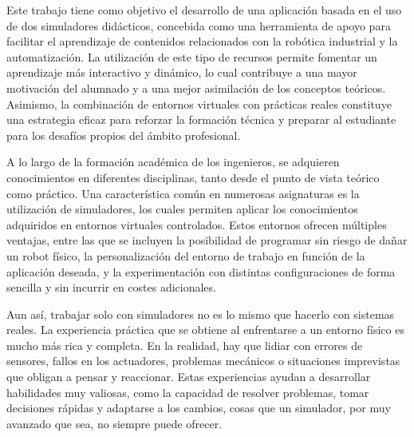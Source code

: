 Este trabajo tiene como objetivo el desarrollo de una aplicación basada en el uso de dos simuladores didácticos, concebida como una herramienta de apoyo para facilitar el aprendizaje de contenidos relacionados con la robótica industrial y la automatización. La utilización de este tipo de recursos permite fomentar un aprendizaje más interactivo y dinámico, lo cual contribuye a una mayor motivación del alumnado y a una mejor asimilación de los conceptos teóricos. Asimismo, la combinación de entornos virtuales con prácticas reales constituye una estrategia eficaz para reforzar la formación técnica y preparar al estudiante para los desafíos propios del ámbito profesional.

A lo largo de la formación académica de los ingenieros, se adquieren conocimientos en diferentes disciplinas, tanto desde el punto de vista teórico como práctico. Una característica común en numerosas asignaturas es la utilización de simuladores, los cuales permiten aplicar los conocimientos adquiridos en entornos virtuales controlados. Estos entornos ofrecen múltiples ventajas, entre las que se incluyen la posibilidad de programar sin riesgo de dañar un robot físico, la personalización del entorno de trabajo en función de la aplicación deseada, y la experimentación con distintas configuraciones de forma sencilla y sin incurrir en costes adicionales.

Aun así, trabajar solo con simuladores no es lo mismo que hacerlo con sistemas reales. La experiencia práctica que se obtiene al enfrentarse a un entorno físico es mucho más rica y completa. En la realidad, hay que lidiar con errores de sensores, fallos en los actuadores, problemas mecánicos o situaciones imprevistas que obligan a pensar y reaccionar. Estas experiencias ayudan a desarrollar habilidades muy valiosas, como la capacidad de resolver problemas, tomar decisiones rápidas y adaptarse a los cambios, cosas que un simulador, por muy avanzado que sea, no siempre puede ofrecer.
